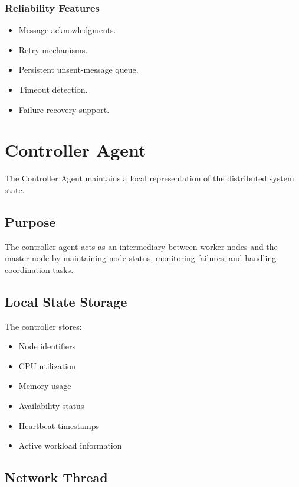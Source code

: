 \documentclass[12pt,a4paper]{article}
\begin{document}
\subsubsection{Reliability Features}

\begin{itemize}
    \item Message acknowledgments.
    \item Retry mechanisms.
    \item Persistent unsent-message queue.
    \item Timeout detection.
    \item Failure recovery support.
\end{itemize}

\newpage

\section{Controller Agent}

The Controller Agent maintains a local representation of the distributed system state.

\subsection{Purpose}

The controller agent acts as an intermediary between worker nodes and the master node by maintaining node status, monitoring failures, and handling coordination tasks.

\subsection{Local State Storage}

The controller stores:

\begin{itemize}
    \item Node identifiers
    \item CPU utilization
    \item Memory usage
    \item Availability status
    \item Heartbeat timestamps
    \item Active workload information
\end{itemize}

\subsection{Network Thread}
\end{document}
